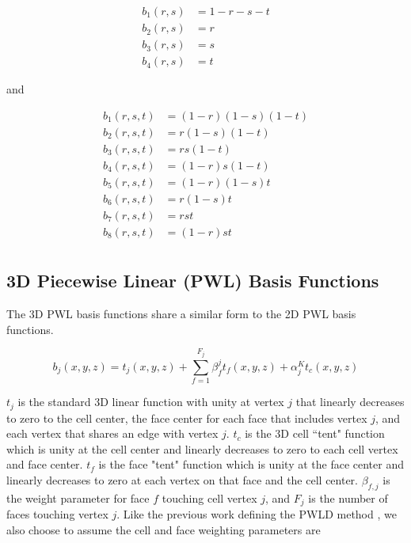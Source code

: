 \begin{equation}
\label{eq::3D_lin_basis_functions}
\begin{aligned}
	b_1(r,s) & = 1-r-s-t \\
	b_2(r,s) & = r \\
	b_3(r,s) & = s \\
	b_4(r,s) & = t
\end{aligned}
\end{equation}

\noindent and

\begin{equation}
\label{eq::TriL_basis_functions}
\begin{aligned}
	b_1(r,s,t) & = (1-r)(1-s)(1-t) \\
	b_2(r,s,t) & = r(1-s)(1-t) \\
	b_3(r,s,t) & = rs(1-t) \\
	b_4(r,s,t) & = (1-r)s(1-t) \\
	b_5(r,s,t) & = (1-r)(1-s)t \\
	b_6(r,s,t) & = r(1-s)t \\
	b_7(r,s,t) & = rst \\
	b_8(r,s,t) & = (1-r)st \\
\end{aligned}
\end{equation}

\subsection{3D Piecewise Linear (PWL) Basis Functions}
\label{sec::BF_3DLinear_PWL}

The 3D PWL basis functions share a similar form to the 2D PWL basis functions.

\begin{equation}
\label{eq::PWL_3D}
	b_j (x,y,z)  = t_j  (x,y,z) + \sum_{f=1}^{F_j} \beta_f^j  t_f (x,y,z) + \alpha_j^K t_c  (x,y,z)
\end{equation}

\noindent $t_j$ is the standard 3D linear function with unity at vertex $j$ that linearly decreases to zero to the cell center, the face center for each face that includes vertex $j$, and each vertex that shares an edge with vertex $j$. $t_c$ is the 3D cell ``tent" function which is unity at the cell center and linearly decreases to zero to each cell vertex and face center. $t_f$ is the face "tent" function which is unity at the face center and linearly decreases to zero at each vertex on that face and the cell center. $\beta_{f,j}$ is the weight parameter for face $f$ touching cell vertex $j$, and $F_j$ is the number of faces touching vertex $j$. Like the previous work defining the PWLD method \cite{bailey2008phd}, we also choose to assume the cell and face weighting parameters are

